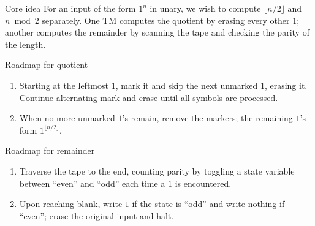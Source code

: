 \begin{frame}[t]{}
  \begin{tblock}{Core idea}
    For an input of the form $1^n$ in unary, we wish to compute
    $\lfloor n/2 \rfloor$ and $n \bmod 2$ separately.  One TM computes
    the quotient by erasing every other $1$; another computes the
    remainder by scanning the tape and checking the parity of the
    length.
  \end{tblock}
  \begin{tblock}{Roadmap for quotient}
    \begin{enumerate}
      \item Starting at the leftmost $1$, mark it and skip the next
        unmarked $1$, erasing it.  Continue alternating mark and erase
        until all symbols are processed.
      \item When no more unmarked $1$’s remain, remove the markers;
        the remaining $1$’s form $1^{\lfloor n/2 \rfloor}$.
    \end{enumerate}
  \end{tblock}
  \begin{tblock}{Roadmap for remainder}
    \begin{enumerate}
      \item Traverse the tape to the end, counting parity by toggling
        a state variable between “even” and “odd” each time a $1$ is
        encountered.
      \item Upon reaching blank, write $1$ if the state is “odd” and
        write nothing if “even”; erase the original input and halt.
    \end{enumerate}
  \end{tblock}
  \label{fr:7.3-06}
\end{frame}

